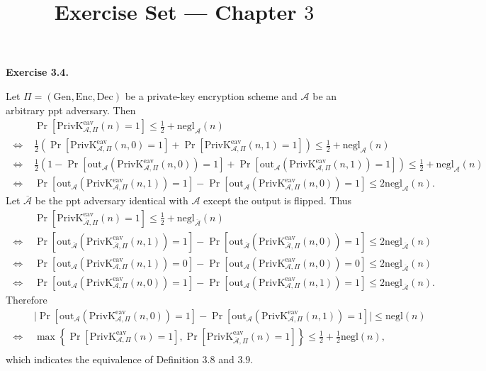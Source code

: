 \documentclass[a4paper]{article}
\title{Exercise Set --- Chapter $3$}
\date{}
\newenvironment{exercise}[1]{
	\par
	\noindent\textbf{Exercise #1.}\quad
}{
	\par
	\bigskip
}
\DeclareMathOperator{\lequiv}{\ \Leftrightarrow\ }
\newcommand{\pbra}[1]{\left( #1 \right)}
\newcommand{\cbra}[1]{\left\{ #1 \right\}}
\newcommand{\sbra}[1]{\left[ #1 \right]}
\newcommand{\Enc}{\mathrm{Enc}}
\newcommand{\Gen}{\mathrm{Gen}}
\newcommand{\Dec}{\mathrm{Dec}}
\newcommand{\PrivK}{\mathrm{PrivK}}
\newcommand{\negl}{\mathrm{negl}}
\newcommand{\ppt}{{\sc ppt} }
\newcommand{\eav}{\mathrm{eav}}
\newcommand{\out}{\mathrm{out}}
\begin{document}
\maketitle

\begin{exercise}{3.4}
    Let $\Pi=(\Gen,\Enc,\Dec)$ be a private-key encryption scheme and $\mathcal A$ be an arbitrary \ppt adversary.
    Then
    \begin{align*}
        &\Pr\sbra{\PrivK_{\mathcal A,\Pi}^{\eav}(n)=1}\leq\frac12+\negl_{\mathcal A}(n)\\
        \lequiv &
        \frac12\pbra{\Pr\sbra{\PrivK_{\mathcal A,\Pi}^{\eav}(n,0)=1}+\Pr\sbra{\PrivK_{\mathcal A,\Pi}^{\eav}(n,1)=1}}
        \leq\frac12+\negl_{\mathcal A}(n)\\
        \lequiv &
        \frac12\pbra{1-\Pr\sbra{\out_{\mathcal A}\pbra{\PrivK_{\mathcal A,\Pi}^\eav(n,0)}=1}
        +\Pr\sbra{\out_{\mathcal A}\pbra{\PrivK_{\mathcal A,\Pi}^\eav(n,1)}=1}}
        \leq\frac12+\negl_{\mathcal A}(n)\\
        \lequiv &
        \Pr\sbra{\out_{\mathcal A}\pbra{\PrivK_{\mathcal A,\Pi}^\eav(n,1)}=1}
        -\Pr\sbra{\out_{\mathcal A}\pbra{\PrivK_{\mathcal A,\Pi}^\eav(n,0)}=1}
        \leq 2\negl_{\mathcal A}(n).
    \end{align*}
    Let $\overline{\mathcal A}$ be the \ppt adversary identical with $\mathcal A$ except the output is flipped.
    Thus
    \begin{align*}
        &\Pr\sbra{\PrivK_{\overline{\mathcal A},\Pi}^{\eav}(n)=1}\leq\frac12+\negl_{\overline{\mathcal A}}(n)\\
        \lequiv &
        \Pr\sbra{\out_{\overline{\mathcal A}}\pbra{\PrivK_{\overline{\mathcal A},\Pi}^\eav(n,1)}=1}
        -\Pr\sbra{\out_{\overline{\mathcal A}}\pbra{\PrivK_{\overline{\mathcal A},\Pi}^\eav(n,0)}=1}
        \leq 2\negl_{\overline{\mathcal A}}(n)\\
        \lequiv &
        \Pr\sbra{\out_{\mathcal A}\pbra{\PrivK_{\mathcal A,\Pi}^\eav(n,1)}=0}
        -\Pr\sbra{\out_{\mathcal A}\pbra{\PrivK_{\mathcal A,\Pi}^\eav(n,0)}=0}
        \leq 2\negl_{\overline{\mathcal A}}(n)\\
        \lequiv &
        \Pr\sbra{\out_{\mathcal A}\pbra{\PrivK_{\mathcal A,\Pi}^\eav(n,0)}=1}
        -\Pr\sbra{\out_{\mathcal A}\pbra{\PrivK_{\mathcal A,\Pi}^\eav(n,1)}=1}
        \leq 2\negl_{\overline{\mathcal A}}(n).
    \end{align*}
    Therefore
    \begin{align*}
        &\Big|
        \Pr\sbra{\out_{\mathcal A}\pbra{\PrivK_{\mathcal A,\Pi}^\eav(n,0)}=1}
        -\Pr\sbra{\out_{\mathcal A}\pbra{\PrivK_{\mathcal A,\Pi}^\eav(n,1)}=1}
        \Big|\leq\negl(n)\\
        \lequiv & 
        \max\cbra{\Pr\sbra{\PrivK_{\mathcal A,\Pi}^{\eav}(n)=1},
        \Pr\sbra{\PrivK_{\overline{\mathcal A},\Pi}^{\eav}(n)=1}}
        \leq\frac12+\frac12\negl(n),\\
    \end{align*}
    which indicates the equivalence of Definition $3.8$ and $3.9$.
\end{exercise}
\end{document}
